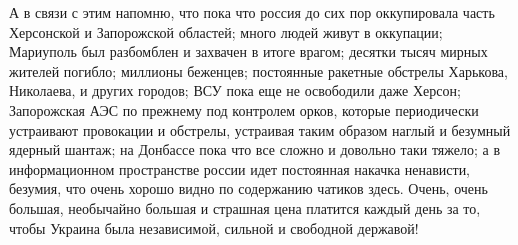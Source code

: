 А в связи с этим напомню, что пока что россия до сих пор оккупировала часть
Херсонской и Запорожской областей; много людей живут в оккупации; Мариуполь был
разбомблен и захвачен в итоге врагом; десятки тысяч мирных жителей погибло;
миллионы беженцев; постоянные ракетные обстрелы Харькова, Николаева, и других
городов; ВСУ пока еще не освободили даже Херсон; Запорожская АЭС по прежнему
под контролем орков, которые периодически устраивают провокации и обстрелы,
устраивая таким образом наглый и безумный ядерный шантаж; на Донбассе пока что
все сложно и довольно таки тяжело; а в информационном пространстве россии идет
постоянная накачка ненависти, безумия, что очень хорошо видно по содержанию
чатиков здесь. Очень, очень большая, необычайно большая и страшная цена
платится каждый день за то, чтобы Украина была независимой, сильной и свободной
державой!


